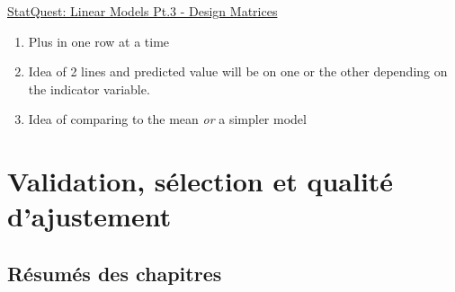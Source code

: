 \documentclass[12pt, titlepage, french]{report}
\begin{document}
\begin{YTB_SUMM}{\href{https://www.youtube.com/watch?v=CqLGvwi-5Pc&list=PLblh5JKOoLUIzaEkCLIUxQFjPIlapw8nU&index=7}{StatQuest: Linear Models Pt.3 - Design Matrices}}
\begin{enumerate}
	\item	Plus in one row at a time
	\item	Idea of 2 lines and predicted value will be on one or the other depending on the indicator variable.
	\item	Idea of comparing to the mean \textit{or} a simpler model
\end{enumerate}
\end{YTB_SUMM}

\section{Validation, sélection et qualité d'ajustement}

\subsection{Résumés des chapitres}
\end{document}
